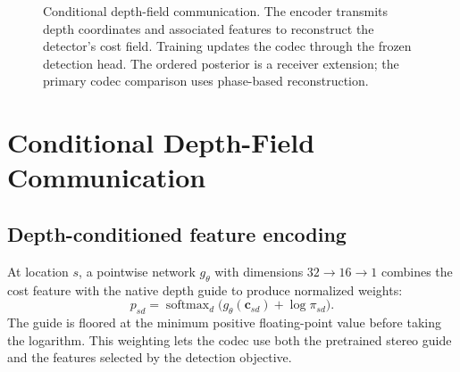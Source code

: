 \documentclass[conference]{IEEEtran}
\begin{document}
\begin{figure}[t]
\centering
{}
\caption{Conditional depth-field communication. The encoder transmits depth
coordinates and associated features to reconstruct the detector's cost
field. Training updates the codec through the frozen detection head.
The ordered posterior is a receiver extension; the primary codec comparison
uses phase-based reconstruction.}
\label{fig:system}
\end{figure}

\section{Conditional Depth-Field Communication}
\subsection{Depth-conditioned feature encoding}
At location $s$, a pointwise network $g_\theta$ with dimensions
$32\!\to\!16\!\to\!1$ combines the cost feature with the native depth
guide to produce normalized weights:
\begin{equation}
 p_{sd}=\operatorname{softmax}_d
 \bigl(g_\theta(\mathbf c_{sd})+\log\pi_{sd}\bigr).
 \label{eq:score}
\end{equation}
The guide is floored at the minimum positive floating-point value before
taking the logarithm. This weighting lets the codec use both the pretrained
stereo guide and the features selected by the detection objective.
\end{document}
